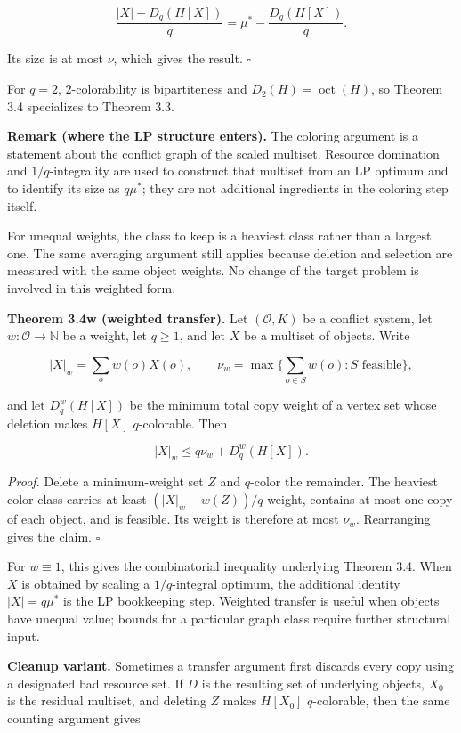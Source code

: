 \documentclass[english,11pt,a4paper]{article}
\begin{document}
\[
\frac{|X|-D_q(H[X])}{q}
=
\mu^*-\frac{D_q(H[X])}{q}.
\]

Its size is at most \(\nu\), which gives the result. \(\square\)

For \(q=2\), \(2\)-colorability is bipartiteness and
\(D_2(H)=\operatorname{oct}(H)\), so Theorem 3.4 specializes to Theorem
3.3.

\textbf{Remark (where the LP structure enters).} The coloring argument
is a statement about the conflict graph of the scaled multiset. Resource
domination and \(1/q\)-integrality are used to construct that multiset
from an LP optimum and to identify its size as \(q\mu^*\); they are not
additional ingredients in the coloring step itself.

For unequal weights, the class to keep is a heaviest class rather than a
largest one. The same averaging argument still applies because deletion
and selection are measured with the same object weights. No change of
the target problem is involved in this weighted form.

\textbf{Theorem 3.4w (weighted transfer).} Let \((\mathcal O,K)\) be a
conflict system, let \(w:\mathcal O\to\mathbb N\) be a weight, let
\(q\ge1\), and let \(X\) be a multiset of objects. Write

\[
|X|_w=\sum_o w(o)X(o),
\qquad
\nu_w=\max\Big\{\sum_{o\in S}w(o):S\text{ feasible}\Big\},
\]

and let \(D_q^w(H[X])\) be the minimum total copy weight of a vertex set
whose deletion makes \(H[X]\) \(q\)-colorable. Then

\[
|X|_w\le q\nu_w+D_q^w(H[X]).
\]

\emph{Proof.} Delete a minimum-weight set \(Z\) and \(q\)-color the
remainder. The heaviest color class carries at least \((|X|_w-w(Z))/q\)
weight, contains at most one copy of each object, and is feasible. Its
weight is therefore at most \(\nu_w\). Rearranging gives the claim.
\(\square\)

For \(w\equiv1\), this gives the combinatorial inequality underlying
Theorem 3.4. When \(X\) is obtained by scaling a \(1/q\)-integral
optimum, the additional identity \(|X|=q\mu^*\) is the LP bookkeeping
step. Weighted transfer is useful when objects have unequal value;
bounds for a particular graph class require further structural input.

\textbf{Cleanup variant.} Sometimes a transfer argument first discards
every copy using a designated bad resource set. If \(D\) is the
resulting set of underlying objects, \(X_0\) is the residual multiset,
and deleting \(Z\) makes \(H[X_0]\) \(q\)-colorable, then the same
counting argument gives
\end{document}
